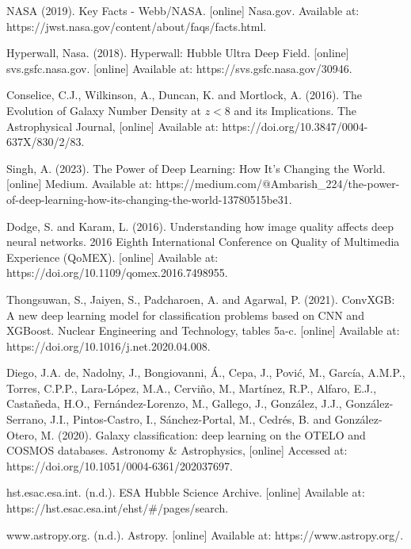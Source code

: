 \documentclass[12pt,runningheads]{llncs}
\begin{document}
\begin{thebibliography}{20}

NASA (2019). Key Facts - Webb/NASA. [online] Nasa.gov. Available at:\\
https://jwst.nasa.gov/content/about/faqs/facts.html.

Hyperwall, Nasa. (2018). Hyperwall: Hubble Ultra Deep Field.
[online] svs.gsfc.nasa.gov. [online] Available at:
https://svs.gsfc.nasa.gov/30946.

Conselice, C.J., Wilkinson, A., Duncan, K. and Mortlock, A. (2016). The
Evolution of Galaxy Number Density at $z < 8$ and
its Implications. The Astrophysical Journal, [online] Available at:
https://doi.org/10.3847/0004-637X/830/2/83.

Singh, A. (2023). The Power of Deep Learning: How It's Changing the World.
[online] Medium. Available at:
https://medium.com/@Ambarish\_224/the-power-of-deep-learning-how-its-changing-the-world-13780515be31.

Dodge, S. and Karam, L. (2016). Understanding how image quality affects deep
neural networks. 2016 Eighth International Conference on Quality of Multimedia
Experience (QoMEX). [online] Available at:
https://doi.org/10.1109/qomex.2016.7498955.

Thongsuwan, S., Jaiyen, S., Padcharoen, A. and Agarwal, P. (2021). ConvXGB: A
new deep learning model for classification problems based on CNN and XGBoost.
Nuclear Engineering and Technology, tables 5a-c. [online] Available at:
https://doi.org/10.1016/j.net.2020.04.008.

Diego, J.A. de, Nadolny, J., Bongiovanni, Á., Cepa, J., Pović, M., García,
A.M.P., Torres, C.P.P., Lara-López, M.A., Cerviño, M., Martínez, R.P., Alfaro,
E.J., Castañeda, H.O., Fernández-Lorenzo, M., Gallego, J., González, J.J.,
González-Serrano, J.I., Pintos-Castro, I., Sánchez-Portal, M., Cedrés, B. and
González-Otero, M. (2020). Galaxy classification: deep learning on the OTELO and
COSMOS databases. Astronomy \& Astrophysics, [online] Accessed at:
https://doi.org/10.1051/0004-6361/202037697.

hst.esac.esa.int. (n.d.). ESA Hubble Science Archive. [online] Available at:\\
https://hst.esac.esa.int/ehst/\#/pages/search.

www.astropy.org. (n.d.). Astropy. [online] Available at:
https://www.astropy.org/.


\end{thebibliography}
\end{document}
